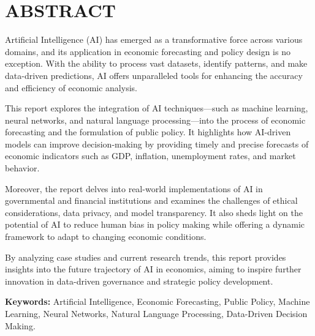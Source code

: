 \chapter*{ABSTRACT}

Artificial Intelligence (AI) has emerged as a transformative force across various domains, and its application in economic forecasting and policy design is no exception. With the ability to process vast datasets, identify patterns, and make data-driven predictions, AI offers unparalleled tools for enhancing the accuracy and efficiency of economic analysis.

This report explores the integration of AI techniques—such as machine learning, neural networks, and natural language processing—into the process of economic forecasting and the formulation of public policy. It highlights how AI-driven models can improve decision-making by providing timely and precise forecasts of economic indicators such as GDP, inflation, unemployment rates, and market behavior.

Moreover, the report delves into real-world implementations of AI in governmental and financial institutions and examines the challenges of ethical considerations, data privacy, and model transparency. It also sheds light on the potential of AI to reduce human bias in policy making while offering a dynamic framework to adapt to changing economic conditions.

By analyzing case studies and current research trends, this report provides insights into the future trajectory of AI in economics, aiming to inspire further innovation in data-driven governance and strategic policy development.

\vspace{1.5cm}
\textbf{Keywords:} Artificial Intelligence, Economic Forecasting, Public Policy, Machine Learning, Neural Networks, Natural Language Processing, Data-Driven Decision Making.